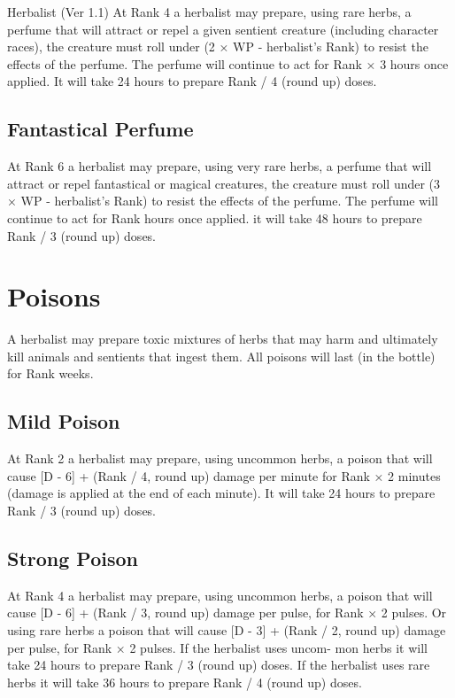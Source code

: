 \begin{Chapter}{Herbalist (Ver 1.1)}
At Rank 4 a herbalist may prepare, using rare herbs, a perfume that
will attract or repel a given sentient creature (including character
races), the creature must roll under (2 × WP - herbalist’s Rank) to
resist the effects of the perfume.  The perfume will continue to act
for Rank × 3 hours once applied. It will take 24 hours to prepare Rank
/ 4 (round up) doses.

\subsection{Fantastical Perfume}

At Rank 6 a herbalist may prepare, using very rare herbs, a perfume
that will attract or repel fantastical or magical creatures, the
creature must roll under (3 × WP - herbalist’s Rank) to resist the
effects of the perfume.  The perfume will continue to act for Rank
hours once applied. it will take 48 hours to prepare Rank / 3 (round
up) doses.

\section{Poisons}

A herbalist may prepare toxic mixtures of herbs that may harm and
ultimately kill animals and sentients that ingest them. All poisons
will last (in the bottle) for Rank weeks.

\subsection{Mild Poison}

At Rank 2 a herbalist may prepare, using uncommon herbs, a poison that
will cause [D - 6] + (Rank / 4, round up) damage per minute for Rank ×
2 minutes (damage is applied at the end of each minute).  It will take
24 hours to prepare Rank / 3 (round up) doses.

\subsection{Strong Poison}

At Rank 4 a herbalist may prepare, using uncommon herbs, a poison that
will cause [D - 6] + (Rank / 3, round up) damage per pulse, for Rank ×
2 pulses. Or using rare herbs a poison that will cause [D - 3] + (Rank
/ 2, round up) damage per pulse, for Rank × 2 pulses.  If the
herbalist uses uncom- mon herbs it will take 24 hours to prepare Rank
/ 3 (round up) doses. If the herbalist uses rare herbs it will take 36
hours to prepare Rank / 4 (round up) doses.


\end{Chapter}
